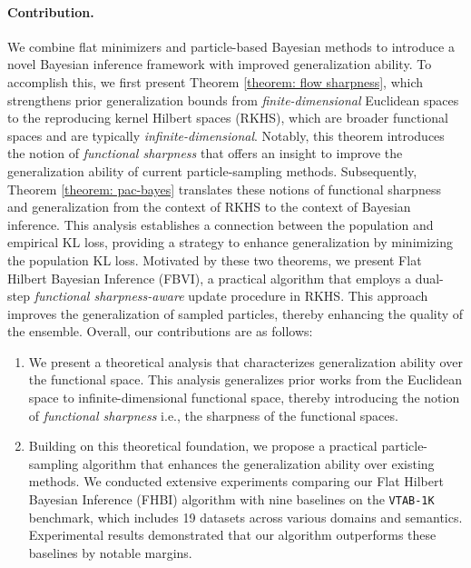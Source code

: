 \paragraph{Contribution.} We combine flat minimizers and particle-based Bayesian methods to introduce a novel Bayesian inference framework with improved generalization ability. To accomplish this, we first present Theorem \ref{theorem: flow sharpness}, which strengthens prior generalization bounds from \textit{finite-dimensional} Euclidean spaces to the reproducing kernel Hilbert spaces (RKHS), which are broader functional spaces and are typically \textit{infinite-dimensional}. Notably, this theorem introduces the notion of \textit{functional sharpness} that offers an insight to improve the generalization ability of current particle-sampling methods. Subsequently, Theorem \ref{theorem: pac-bayes} translates these notions of functional sharpness and generalization from the context of RKHS to the context of Bayesian inference. This analysis establishes a connection between the population and empirical KL loss, providing a strategy to enhance generalization by minimizing the population KL loss. Motivated by these two theorems, we present Flat Hilbert Bayesian Inference (FBVI), a practical algorithm that employs a dual-step \textit{functional sharpness-aware} update procedure in RKHS. This approach improves the generalization of sampled particles, thereby enhancing the quality of the ensemble. Overall, our contributions are as follows:
\begin{enumerate}
\item We present a theoretical analysis that characterizes generalization ability over the functional space. This analysis generalizes prior works from the Euclidean space to infinite-dimensional functional space, thereby introducing the notion of \textit{functional sharpness} i.e., the sharpness of the functional spaces.
\item Building on this theoretical foundation, we propose a practical particle-sampling algorithm that enhances the generalization ability over existing methods. We conducted extensive experiments comparing our Flat Hilbert Bayesian Inference (FHBI) algorithm with nine baselines on the \texttt{VTAB-1K} benchmark, which includes 19 datasets across various domains and semantics. Experimental results demonstrated that our algorithm outperforms these baselines by notable margins.
\end{enumerate}

